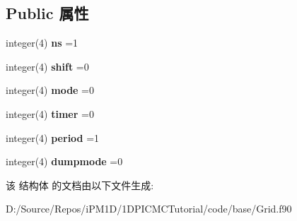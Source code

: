 \subsection*{Public 属性}
\begin{DoxyCompactItemize}
\item 
\mbox{\label{structmodulegrid_1_1grid_ad33c2b90d0441cdb9cb4e7c5d8c24b0d}} 
integer(4) {\bfseries ns} =1
\item 
\mbox{\label{structmodulegrid_1_1grid_ab69d44d81ea70d652ecd4869e2f33034}} 
integer(4) {\bfseries shift} =0
\item 
\mbox{\label{structmodulegrid_1_1grid_a39fc6e53b24b3c90f6f5709cf54196ff}} 
integer(4) {\bfseries mode} =0
\item 
\mbox{\label{structmodulegrid_1_1grid_a4e44fd62d3cf0f86d55d369ed443e5a4}} 
integer(4) {\bfseries timer} =0
\item 
\mbox{\label{structmodulegrid_1_1grid_a42ac7390fb24014aee6ce325d607deea}} 
integer(4) {\bfseries period} =1
\item 
\mbox{\label{structmodulegrid_1_1grid_a170c244971580a9ebbfb8a09c982db6a}} 
integer(4) {\bfseries dumpmode} =0
\end{DoxyCompactItemize}


该 结构体 的文档由以下文件生成\+:\begin{DoxyCompactItemize}
\item 
D\+:/\+Source/\+Repos/i\+P\+M1\+D/1\+D\+P\+I\+C\+M\+C\+Tutorial/code/base/Grid.\+f90\end{DoxyCompactItemize}
